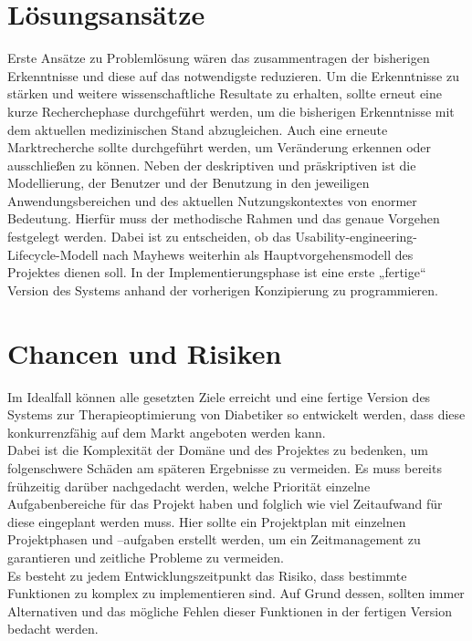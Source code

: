 \documentclass[a4paper, 12pt]{scrartcl}
\begin{document}
			\section{Lösungsansätze}
				Erste Ansätze zu Problemlösung wären das zusammentragen der bisherigen Erkenntnisse und diese auf das notwendigste reduzieren. Um die Erkenntnisse zu stärken und weitere wissenschaftliche Resultate zu erhalten, sollte erneut eine kurze Recherchephase durchgeführt werden, um die bisherigen Erkenntnisse mit dem aktuellen medizinischen Stand abzugleichen. Auch eine erneute Marktrecherche sollte durchgeführt werden, um Veränderung erkennen oder ausschließen zu können. Neben der deskriptiven und präskriptiven ist die Modellierung, der Benutzer und der Benutzung in den jeweiligen Anwendungsbereichen und des aktuellen Nutzungskontextes von enormer Bedeutung. Hierfür muss der methodische Rahmen und das genaue Vorgehen festgelegt werden. Dabei ist zu entscheiden, ob das Usability-engineering-Lifecycle-Modell nach Mayhews weiterhin als Hauptvorgehensmodell des Projektes dienen soll. In der Implementierungsphase ist eine erste „fertige“ Version des Systems anhand der vorherigen Konzipierung zu programmieren.
				
							
			\section{Chancen und Risiken}
				Im Idealfall können alle gesetzten Ziele erreicht und eine fertige Version des Systems zur Therapieoptimierung von Diabetiker so entwickelt werden, dass diese konkurrenzfähig auf dem Markt angeboten werden kann.\\
				Dabei ist die Komplexität der Domäne und des Projektes zu bedenken, um folgenschwere Schäden am späteren Ergebnisse zu vermeiden. Es muss bereits frühzeitig darüber nachgedacht werden, welche Priorität einzelne Aufgabenbereiche für das Projekt haben und folglich wie viel Zeitaufwand für diese eingeplant werden muss. Hier sollte ein Projektplan mit einzelnen Projektphasen und –aufgaben erstellt werden, um ein Zeitmanagement zu garantieren und zeitliche Probleme zu vermeiden. \\
				Es besteht zu jedem Entwicklungszeitpunkt das Risiko, dass bestimmte Funktionen zu komplex zu implementieren sind. Auf Grund dessen, sollten immer Alternativen und das mögliche Fehlen dieser Funktionen in der fertigen Version bedacht werden.

			
\end{document}

